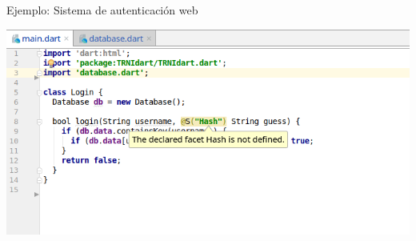 \documentclass[aspectratio=169,10pt]{beamer}
\begin{document}

\begin{frame}[fragile]{Ejemplo: Sistema de autenticación web}
	\begin{center}
		\includegraphics[width=1.0\textwidth]{images/login3.png}
	\end{center}
\end{frame}

%
\end{document}
